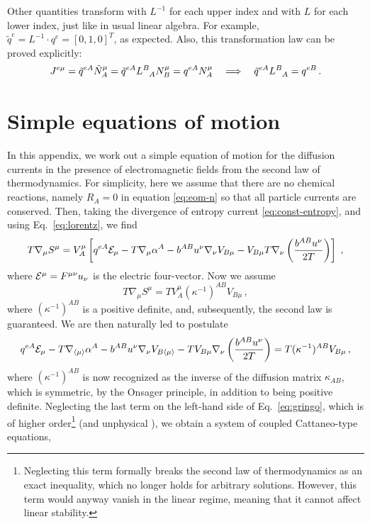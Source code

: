 \documentclass[
a4paper,
amsfonts,
amsmath,
reprint,
showkeys,
nofootinbib,
twoside,
onecolumn,
notitlepage
]{revtex4-1}
\begin{document}
	Other quantities transform with $L^{-1}$ for each upper index and with $L$ for each lower index, just like in usual linear algebra.
	For example, $\tilde{q}^e = L^{-1}\cdot q^e = [0,1,0]^T$, as expected. 
	Also, this transformation law can be proved explicitly:
	\begin{equation}
		J^{e\mu}=\tilde{q}^{eA} \tilde{N}_A^\mu=\tilde{q}^{eA} L\indices{^B_A} N_B^\mu=q^{eA} N_A^\mu \quad \Longrightarrow \quad \tilde{q}^{eA} L\indices{^B_A} = q^{eB} \, .
	\end{equation}
	
	\section{Simple equations of motion}\label{app:eom}
	
	In this appendix, we work out a simple equation of motion for the diffusion currents in the presence of electromagnetic fields from the second law of thermodynamics. For simplicity, here we assume that there are no chemical reactions, namely $R_A=0$ in equation \eqref{eq:eom-n} so that all particle currents are conserved.
	Then, taking the divergence of entropy current \eqref{eq:const-entropy}, and using Eq.\ \eqref{eq:lorentz}, we find 
	\begin{eqnarray}\label{TdS}
		T\nabla_\mu S^\mu = V_{A}^{\mu}
		\left[
		q^{eA} {\mathcal{E}}_\mu - T\nabla_\mu \alpha^A - b^{AB} u^\nu\nabla_\nu V_{B\mu} - V_{B\mu} T \nabla_\nu\left(\frac{b^{AB}u^\nu}{2T}\right)
		\right]  \;,
	\end{eqnarray}
	where ${\mathcal{E}}^\mu = F^{\mu\nu}u_\nu$ is the electric four-vector.
	Now we assume 
	\begin{equation}\label{TdS2}
		T \nabla_\mu S^\mu = T V_{A}^\mu (\kappa^{-1})^{AB} V_{B\mu}  \, , 
	\end{equation}
	where $(\kappa^{-1})^{AB}$ is a positive definite, and, subsequently, the second law is guaranteed.
	We are then naturally led to postulate
	\begin{equation}\label{eq:gringo}
		q^{eA} {\mathcal{E}}_\mu - T\nabla_{\langle \mu \rangle} \alpha^A - b^{AB} u^\nu \nabla_\nu V_{B\langle \mu \rangle} -  T  V_{B\mu}\nabla_\nu\left(\frac{b^{AB}u^\nu}{2T}\right) = T(\kappa^{-1})^{AB} V_{B\mu} \, , 
	\end{equation}
	where $(\kappa^{-1})^{AB}$ is now recognized as the inverse of the diffusion matrix $\kappa_{AB}$, which is symmetric, by the Onsager principle, in addition to being positive definite. 
	Neglecting the last term on the left-hand side of Eq.\ \eqref{eq:gringo}, which is of higher order\footnote{Neglecting this term formally breaks the second law of thermodynamics as an exact inequality, which  no longer holds for arbitrary solutions. However, this term would anyway vanish in the linear regime, meaning that it cannot affect linear stability.} (and unphysical \cite{GavassinoFarFromBulk2023}), we obtain a system of coupled Cattaneo-type equations,
\end{document}

